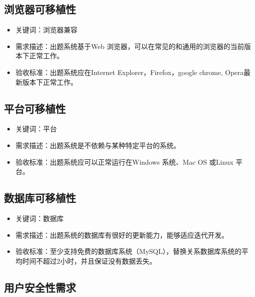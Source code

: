 \documentclass[hyperref, a4paper]{ctexart}
\providecommand{\tightlist}{%
  \setlength{\itemsep}{0pt}\setlength{\parskip}{0pt}}
\begin{document}
\hypertarget{ux6d4fux89c8ux5668ux53efux79fbux690dux6027}{%
\subsection{浏览器可移植性}\label{ux6d4fux89c8ux5668ux53efux79fbux690dux6027}}

\begin{itemize}
\tightlist
\item
  关键词：浏览器兼容
\item
  需求描述：出题系统基于Web
  浏览器，可以在常见的和通用的浏览器的当前版本下正常工作。
\item
  验收标准：出题系统应在Internet Explorer，Firefox，google chrome,
  Opera最新版本下正常工作。
\end{itemize}

\hypertarget{ux5e73ux53f0ux53efux79fbux690dux6027}{%
\subsection{平台可移植性}\label{ux5e73ux53f0ux53efux79fbux690dux6027}}

\begin{itemize}
\tightlist
\item
  关键词：平台
\item
  需求描述：出题系统是不依赖与某种特定平台的系统。
\item
  验收标准：出题系统应可以正常运行在Windows 系统、Mac OS 或Linux 平台。
\end{itemize}

\hypertarget{ux6570ux636eux5e93ux53efux79fbux690dux6027}{%
\subsection{数据库可移植性}\label{ux6570ux636eux5e93ux53efux79fbux690dux6027}}

\begin{itemize}
\tightlist
\item
  关键词：数据库
\item
  需求描述：出题系统的数据库有很好的更新能力，能够适应迭代开发。
\item
  验收标准：至少支持免费的数据库系统（MySQL），替换关系数据库系统的平均时间不超过2小时，并且保证没有数据丢失。
\end{itemize}

\hypertarget{ux7528ux6237ux5b89ux5168ux6027ux9700ux6c42}{%
\subsection{用户安全性需求}\label{ux7528ux6237ux5b89ux5168ux6027ux9700ux6c42}}
\end{document}
